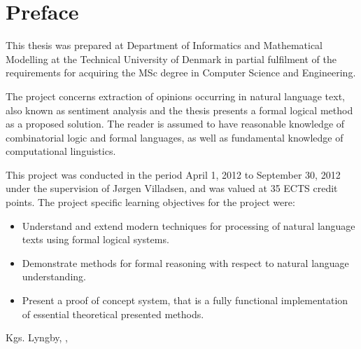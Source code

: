 
\chapter{Preface}
\vspace{-1em}

This thesis was prepared at Department of Informatics and Mathematical Modelling at the Technical University of Denmark in partial fulfilment of the
requirements for acquiring the MSc degree in Computer Science and Engineering. 

The project concerns extraction of opinions occurring in natural language text, also known as sentiment analysis and the thesis presents a formal logical method as a proposed solution. The reader is assumed to have reasonable knowledge of combinatorial  logic and formal languages, as well as fundamental knowledge of computational linguistics. 

This project was conducted in the period April 1, 2012 to September 30, 2012 under the supervision of Jørgen Villadsen, and was valued at 35 ECTS credit points. The project specific learning objectives for the project were:

\begin{minipage}{.8\textwidth}
\it
\begin{itemize}
	\item Understand and extend modern techniques for processing of natural language texts using formal logical systems.
	\item Demonstrate methods for formal reasoning with respect to natural language understanding.
	\item Present a proof of concept system, that is a fully functional implementation of essential theoretical presented methods.
\end{itemize}
\end{minipage}
\vfill
\begin{flushright}
 	Kgs. Lyngby, \thesishandin, \thesisyear\\
	\vspace*{2.13cm}\\[-1.5em]
	\thesisauthor
\end{flushright}
\vspace{-3em}